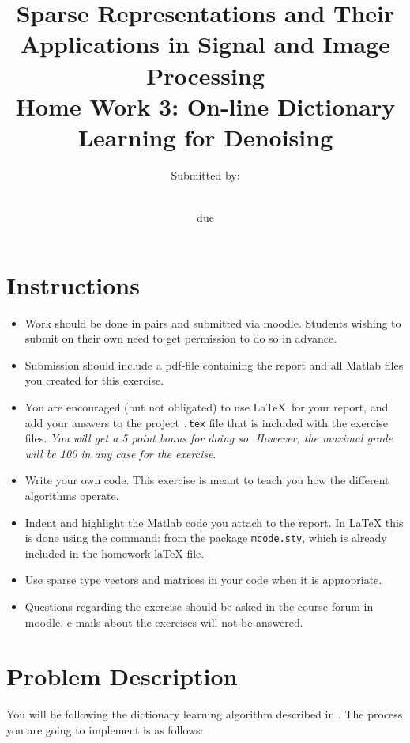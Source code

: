 \documentclass[]{article}
\title{Sparse Representations and Their Applications in Signal and Image Processing \break\\
	Home Work 3: On-line Dictionary Learning for Denoising}
\author{Submitted by: \begin{tabular}{cc}
		\StudentA & \StudentIdA \\ 
		\StudentB  & \StudentIdB 
	\end{tabular}}
\date{due \dueDate}
\newcommand \BeginAnswer {\begin{mdframed}[backgroundcolor=blue!15]}
\newcommand{\EndAnswer}{\end{mdframed}}
\begin{document}
		\maketitle
		\section*{Instructions} 
		
		\begin{itemize}
			\item Work should be done in pairs and submitted via moodle. Students wishing to submit on their own need to get permission to do so in advance. 
			\item Submission should include a pdf-file containing the report and all Matlab files you created for this exercise.
			\item You are encouraged (but not obligated) to use \LaTeX\ for your report, and add your answers to the project \texttt{.tex} file that is included with the exercise files. \emph{You will get a 5 point bonus for doing so. However, the maximal grade will be 100 in any case for the exercise}.
			\item Write your own code. This exercise is meant to teach you how the different algorithms operate.
			\item Indent and highlight the Matlab code you attach to the report. In LaTeX this is done using the command: \lstinline|| from the package \lstinline|mcode.sty|, which is already included in the homework laTeX file. 
			\item Use sparse type vectors and matrices in your code when it is appropriate.
			\item Questions regarding the exercise should be asked in the course forum in moodle, e-mails about the exercises will not be answered.    
		\end{itemize}
		
		\section{ Problem Description } 
		You will be following the dictionary learning algorithm described in \cite{mairal2009online}. The process you are going to implement is as follows:
\end{document}
